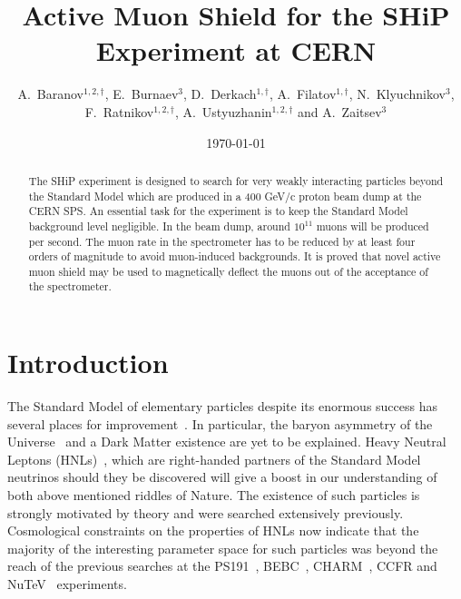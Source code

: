 \documentclass[a4paper]{jpconf}
\theoremstyle{my_theorem_style}
\numberwithin{equation}{section}
\begin{document}
\title{Active Muon Shield for the SHiP Experiment at CERN}
\author{A.~Baranov$^{1,2,\dagger}$, E.~Burnaev$^{3}$,  D.~Derkach$^{1,\dagger}$, A.~Filatov$^{1,\dagger}$,
  N.~Klyuchnikov$^{3}$,  F.~Ratnikov$^{1,2,\dagger}$,
  A.~Ustyuzhanin$^{1,2,\dagger}$  and
 A.~Zaitsev$^{3}$
}
\address{$^1$ National Research University Higher School of Economics,  Moscow, Russia \\
$^2$ Yandex School of Data Analysis, Moscow, Russia \\
$^3$ Skolkovo Institute of Science and Technology, Moscow, Russia \\
$^\dagger$ on behalf of the LHCb Collaboration}

\begin{abstract}
The SHiP experiment is designed to search for very weakly interacting particles beyond the Standard Model which are produced in a 400 GeV/c proton beam dump at the CERN SPS. An essential task for the experiment is to keep the Standard Model background level negligible. In the beam dump, around $10^{11}$ muons will be produced per second. The muon rate in the spectrometer has to be reduced by at least four orders of magnitude to avoid muon-induced backgrounds. It is proved that novel active muon shield may be used to magnetically deflect the muons out of the acceptance of the spectrometer.
\end{abstract}

\date{\today}



\section{Introduction}
\label{intro}
The Standard Model of elementary particles despite its enormous success has several places for improvement~\cite{Ellis:2009tp}. In particular, the baryon asymmetry of the Universe~\cite{Asaka:2005pn} and a Dark Matter existence are yet to be explained. Heavy Neutral Leptons (HNLs)~\cite{Asaka:2005an}, which are right-handed partners of the Standard Model neutrinos should they be discovered will give a boost in our understanding of both above mentioned riddles of Nature. The existence of such particles is strongly motivated by theory and were searched extensively previously. Cosmological constraints on the properties of HNLs now indicate that the majority of the interesting parameter space for such particles was beyond the reach of the previous searches at the PS191~\cite{Bernardi:1985ny}, BEBC~\cite{CooperSarkar:1985nh}, CHARM~\cite{Bergsma:1985is}, CCFR and NuTeV~\cite{Vaitaitis:1999wq} experiments. 
\end{document}
